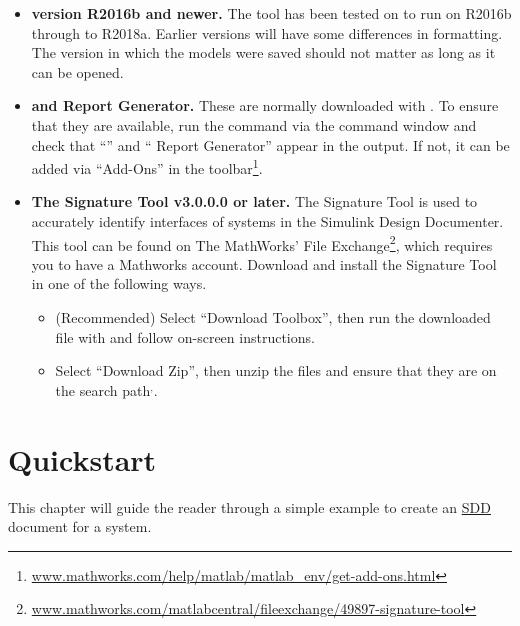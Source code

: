 \documentclass{mcscert}
\newcommand{\mathworks}{The MathWorks}
\newcommand{\rptgen}{\simulink{} Report Generator}
\newcommand{\sigtool}{Signature Tool}
\newcommand{\sddtool}{Simulink Design Documenter}
\begin{document}
\begin{itemize}
		\item {\bf \matlab version R2016b and newer.}  \label{ite:matlab-ver} 
		The tool has been tested on to run on \matlab{} R2016b through to R2018a. 
		Earlier versions will have some differences in formatting. 
		The version in which the \simulink{} models were saved should not matter as long as it can be opened. %
	
		\item {\bf{\simulink{} and \rptgen{}.}} 
		These are normally downloaded with \matlab{}. 
		To ensure that they are available, run the {\bf{}} command via the \matlab{} command window and check	that ``\simulink{}'' and ``\rptgen{}'' appear in the output. 
		If not, it can be added via ``Add-Ons'' in the toolbar\footnote{\href{https://www.mathworks.com/help/matlab/matlab_env/get-add-ons.html}{www.mathworks.com/help/matlab/matlab\_env/get-add-ons.html}}.
		
		\item {\bf{The \sigtool{} v3.0.0.0 or later.}}
		The \sigtool{} is used to accurately identify interfaces of \simulink{} systems in the \sddtool{}. 
		This tool can be found on \mathworks{}' File Exchange\footnote{\href{https://www.mathworks.com/matlabcentral/fileexchange/49897-signature-tool}{www.mathworks.com/matlabcentral/fileexchange/49897-signature-tool}}, which requires you to have a Mathworks account\label{itm:download-tool}. 
		Download and install the \sigtool{} in one of the following ways. %
		
		\begin{itemize}
			\item (Recommended) Select ``Download Toolbox'', then run the downloaded file with \matlab{} and follow on-screen instructions.
			\item Select ``Download Zip'', then unzip the files and ensure that they are on the \matlab{} search path$^{,}$.
		\end{itemize}
\end{itemize}

\chapter{Quickstart} 
\label{ch:quickstart}
This chapter will guide the reader through a simple example to create an \hyperref[acr:sdd]{SDD} document for a \simulink{} system.
\end{document}
